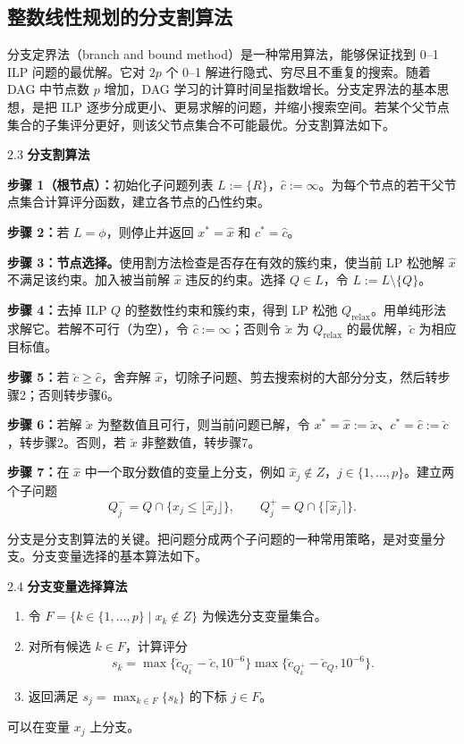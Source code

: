 \subsection{整数线性规划的分支割算法}

分支定界法（branch and bound method）是一种常用算法，能够保证找到 0--1 ILP 问题的最优解。它对 $2p$ 个 0--1 解进行隐式、穷尽且不重复的搜索。随着 DAG 中节点数 $p$ 增加，DAG 学习的计算时间呈指数增长。分支定界法的基本思想，是把 ILP 逐步分成更小、更易求解的问题，并缩小搜索空间。若某个父节点集合的子集评分更好，则该父节点集合不可能最优。分支割算法如下。

\begin{bookalgorithm}{2.3}
\textbf{分支割算法}

\noindent\textbf{步骤 1（根节点）：}初始化子问题列表 $L:=\{R\}$，$\widehat c:=\infty$。为每个节点的若干父节点集合计算评分函数，建立各节点的凸性约束。

\noindent\textbf{步骤 2：}若 $L=\phi$，则停止并返回 $x^*=\widehat x$ 和 $c^*=\widehat c$。

\noindent\textbf{步骤 3：节点选择。}使用割方法检查是否存在有效的簇约束，使当前 LP 松弛解 $\widehat x$ 不满足该约束。加入被当前解 $\widehat x$ 违反的约束。选择 $Q\in L$，令 $L:=L\setminus\{Q\}$。

\noindent\textbf{步骤 4：}去掉 ILP $Q$ 的整数性约束和簇约束，得到 LP 松弛 $Q_{\mathrm{relax}}$。用单纯形法求解它。若解不可行（为空），令 $\widehat c:=\infty$；否则令 $\breve x$ 为 $Q_{\mathrm{relax}}$ 的最优解，$\breve c$ 为相应目标值。

\noindent\textbf{步骤 5：}若 $\breve c\geq\widehat c$，舍弃解 $\widehat x$，切除子问题、剪去搜索树的大部分分支，然后转步骤2；否则转步骤6。

\noindent\textbf{步骤 6：}若解 $\breve x$ 为整数值且可行，则当前问题已解，令 $x^*=\widehat x:=\breve x$、$c^*=\widehat c:=\breve c$，转步骤2。否则，若 $\breve x$ 非整数值，转步骤7。

\noindent\textbf{步骤 7：}在 $\widehat x$ 中一个取分数值的变量上分支，例如 $\widehat x_j\notin Z$，$j\in\{1,\ldots,p\}$。建立两个子问题
\[
Q_j^-=Q\cap\{x_j\leq\lfloor\widehat x_j\rfloor\},
\qquad
Q_j^+=Q\cap\{\lceil\widehat x_j\rceil\}.
\]
\end{bookalgorithm}
分支是分支割算法的关键。把问题分成两个子问题的一种常用策略，是对变量分支。分支变量选择的基本算法如下。

\begin{bookalgorithm}{2.4}
\textbf{分支变量选择算法}
\begin{enumerate}
\item 令 $F=\{k\in\{1,\ldots,p\}\mid x_k\notin Z\}$ 为候选分支变量集合。
\item 对所有候选 $k\in F$，计算评分
\[
s_k=\max\{\breve c_{Q_k^-}-\breve c,10^{-6}\}
\max\{\breve c_{Q_k^+}-\breve c_Q,10^{-6}\}.
\]
\item 返回满足 $s_j=\max_{k\in F}\{s_k\}$ 的下标 $j\in F$。
\end{enumerate}
可以在变量 $x_j$ 上分支。
\end{bookalgorithm}

